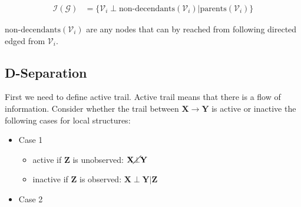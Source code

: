 \documentclass[11pt]{article}
\newcommand{\SetOf}[1]{\mathbf{#1}} %
\newcommand{\Eq}[1]{\begin{align*}#1\end{align*}} %
\newcommand{\cursive}[1]{\mathcal{#1}}
\begin{document}
	\Eq{\cursive{I}(\cursive{G}) &= \{ \cursive{V}_i \perp \text{non-decendants}(\cursive{V}_i) | \text{parents}(\cursive{V}_i) \}}

	$\text{non-decendants}(\cursive{V}_i)$ are any nodes that can by reached from following directed edged from $\cursive{V}_i$.

	\subsection{D-Separation}
	First we need to define active trail. Active trail means that there is a flow of information. Consider whether the trail between $\SetOf{X}\to \SetOf{Y}$ is active or inactive the following cases for local structures:
	\begin{itemize}
		\item Case 1

		\begin{center}
		\end{center}
		\begin{center}
		\end{center}
		\begin{itemize}
			\item active if $\SetOf{Z}$ is unobserved: $\SetOf{X} \cancel{\perp} \SetOf{Y}$
			\item inactive if $\SetOf{Z}$ is observed: $\SetOf{X} \perp \SetOf{Y} | \SetOf{Z}$
		\end{itemize}

		\item Case 2
		\begin{center}
\end{center}
\end{itemize}
\end{document}
